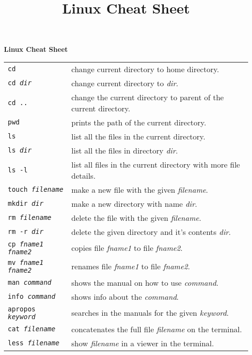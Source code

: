 \documentclass[11pt,a4paper]{article}
\title{Linux Cheat Sheet}
\author{}
\date{}
\begin{document}
\begin{center}
	\begin{huge}
		\textbf{Linux Cheat Sheet}\\[1cm]
	\end{huge}
\end{center}

\begin{table}[!ht]
	\centering
	\begin{tabular}{p{4.4cm}p{10.3cm}}
		\toprule[1pt]
		\texttt{cd} & change current directory to home directory.\\
		\texttt{cd \emph{dir}} & change current directory to \emph{dir}.\\
		\texttt{cd ..} & change the current directory to parent of the current directory.\\
		\texttt{pwd} & prints the path of the current directory.\\
		\midrule
		\texttt{ls} & list all the files in the current directory.\\
		\texttt{ls \emph{dir}} & list all the files in directory \emph{dir}.\\
		\texttt{ls -l} & list all files in the current directory with more file details.\\
		\midrule
		\texttt{touch \emph{filename}} & make a new file with the given \emph{filename}.\\
		\texttt{mkdir \emph{dir}} & make a new directory with name \emph{dir}.\\
		\texttt{rm \emph{filename}} & delete the file with the given \emph{filename}.\\
		\texttt{rm -r \emph{dir}} & delete the given directory and it's contents \emph{dir}.\\
		\texttt{cp \emph{fname1} \emph{fname2}} & copies file \emph{fname1} to file \emph{fname2}.\\
		\texttt{mv \emph{fname1} \emph{fname2}} & renames file \emph{fname1} to file \emph{fname2}.\\
		\midrule
		\texttt{man \emph{command}} & shows the manual on how to use \emph{command}.\\
		\texttt{info \emph{command}} & shows info about the \emph{command}.\\
		\texttt{apropos \emph{keyword}} & searches in the manuals for the given \emph{keyword}.\\
		\midrule
		\texttt{cat \emph{filename}} & concatenates the full file \emph{filename} on the terminal.\\
		\texttt{less \emph{filename}} & show \emph{filename} in a viewer in the terminal.\\

\end{tabular}
\end{table}
\end{document}
